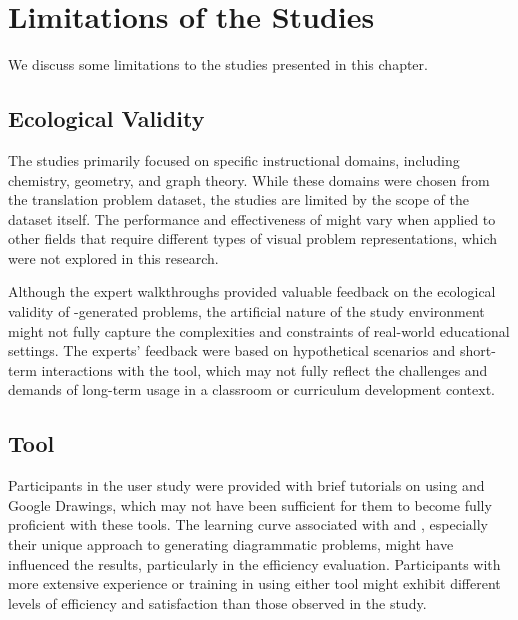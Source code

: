 \section{Limitations of the Studies}

We discuss some limitations to the studies presented in this chapter. 




\subsection{Ecological Validity}

The studies primarily focused on specific instructional domains, including chemistry, geometry, and graph theory. While these domains were chosen from the translation problem dataset, the studies are limited by the scope of the dataset itself. The performance and effectiveness of \Edgeworth might vary when applied to other fields that require different types of visual problem representations, which were not explored in this research.

Although the expert walkthroughs provided valuable feedback on the ecological validity of \Edgeworth-generated problems, the artificial nature of the study environment might not fully capture the complexities and constraints of real-world educational settings. The experts' feedback were based on hypothetical scenarios and short-term interactions with the tool, which may not fully reflect the challenges and demands of long-term usage in a classroom or curriculum development context.

\subsection{Tool}
Participants in the user study were provided with brief tutorials on using \Edgeworth and Google Drawings, which may not have been sufficient for them to become fully proficient with these tools. The learning curve associated with \Penrose and \Edgeworth, especially their unique approach to generating diagrammatic problems, might have influenced the results, particularly in the efficiency evaluation. Participants with more extensive experience or training in using either tool might exhibit different levels of efficiency and satisfaction than those observed in the study.

